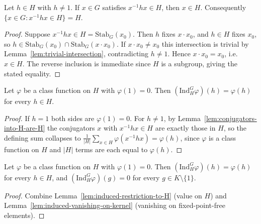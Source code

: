 \begin{lemma}
    \label{lem:conjugators-into-H-are-H}
    \leanok
    Let $h \in H$ with $h \neq 1$. If $x \in G$ satisfies $x^{-1} h x \in H$, then
    $x \in H$. Consequently $\{x \in G : x^{-1} h x \in H\} = H$.
\end{lemma}
\begin{proof}
    Suppose $x^{-1} h x \in H = \mathrm{Stab}_G(x_0)$. Then $h$ fixes $x \cdot
    x_0$, and $h \in H$ fixes $x_0$, so $h \in \mathrm{Stab}_G(x_0) \cap
    \mathrm{Stab}_G(x \cdot x_0)$. If $x \cdot x_0 \neq x_0$ this intersection is
    trivial by Lemma~\ref{lem:trivial-intersection}, contradicting $h \neq 1$.
    Hence $x \cdot x_0 = x_0$, i.e.\ $x \in H$. The reverse inclusion is immediate
    since $H$ is a subgroup, giving the stated equality.
\end{proof}

\begin{lemma}[Induced function restricts to $H$ when $\varphi(1)=0$]
    \label{lem:induced-restriction-to-H}
    Let $\varphi$ be a class function on $H$ with $\varphi(1) = 0$. Then
    $(\mathrm{Ind}_H^G \varphi)(h) = \varphi(h)$ for every $h \in H$.
\end{lemma}
\begin{proof}
    If $h = 1$ both sides are $\varphi(1) = 0$. For $h \neq 1$, by
    Lemma~\ref{lem:conjugators-into-H-are-H} the conjugators $x$ with $x^{-1} h x
    \in H$ are exactly those in $H$, so the defining sum collapses to
    $\frac{1}{|H|}\sum_{x \in H}\varphi(x^{-1}hx) = \varphi(h)$, since $\varphi$ is
    a class function on $H$ and $|H|$ terms are each equal to $\varphi(h)$.
\end{proof}

\begin{lemma}
    \label{lem:induced-vanishing-restriction}
    \leanok
    Let $\varphi$ be a class function on $H$ with $\varphi(1) = 0$. Then
    $(\mathrm{Ind}_H^G \varphi)(h) = \varphi(h)$ for every $h \in H$, and
    $(\mathrm{Ind}_H^G \varphi)(g) = 0$ for every $g \in K \setminus \{1\}$.
\end{lemma}
\begin{proof}
    Combine Lemma~\ref{lem:induced-restriction-to-H} (value on $H$) and
    Lemma~\ref{lem:induced-vanishing-on-kernel} (vanishing on fixed-point-free
    elements).
\end{proof}


